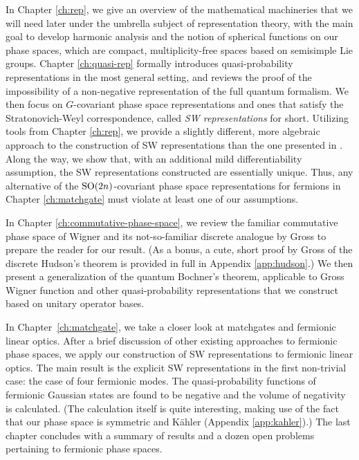 In Chapter \ref{ch:rep}, we give an overview of the mathematical machineries that we will need later under the umbrella subject of representation theory, with the main goal to develop  harmonic analysis and the notion of spherical functions on our phase spaces, which are compact, multiplicity-free spaces based on semisimple Lie groups.
Chapter \ref{ch:quasi-rep} formally introduces quasi-probability representations in the most general setting, and reviews the proof \cite{ferrie_frame_2008} of the impossibility of a non-negative representation of the full quantum formalism. We then focus on $G$-covariant phase space representations and ones that satisfy the Stratonovich-Weyl correspondence, called \emph{SW representations} for short. Utilizing tools from Chapter \ref{ch:rep}, we provide a slightly different, more algebraic approach to the construction of SW representations than the one presented in \cite{brif_phase-space_1999}. Along the way, we show that, with an additional mild differentiability assumption, the SW representations constructed are essentially unique. Thus, any alternative of the $\text{SO}(2n)$-covariant phase space representations for fermions in Chapter \ref{ch:matchgate} must violate at least one of our assumptions.

In Chapter \ref{ch:commutative-phase-space}, we review the familiar commutative phase space of Wigner and its not-so-familiar discrete analogue by Gross \cite{gross_hudsons_2006} to prepare the reader for our result. (As a bonus, a cute, short proof by Gross \cite{gross2015coogee} of the discrete Hudson's theorem is provided in full in Appendix \ref{app:hudson}.) We then present a generalization of the quantum Bochner's theorem, applicable to Gross Wigner function and other quasi-probability representations that we construct based on unitary operator bases.

In Chapter~\ref{ch:matchgate}, we take a closer look at matchgates and fermionic linear optics. After a brief discussion of other existing approaches to fermionic phase spaces, we apply our construction of SW representations to fermionic linear optics. The main result is the explicit SW representations in the first non-trivial case: the case of four fermionic modes. The quasi-probability functions of fermionic Gaussian states are found to be negative and the volume of negativity is calculated. (The calculation itself is quite interesting, making use of the fact that our phase space is symmetric and K{\"a}hler (Appendix \ref{app:kahler}).) The last chapter concludes with a summary of results and a dozen open problems pertaining to fermionic phase spaces.

